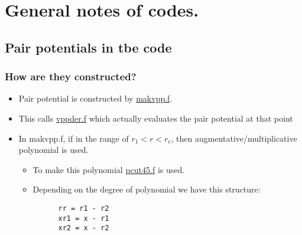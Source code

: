 \documentclass[11pt]{article}
\begin{document}
\section{General notes of codes.}
\label{sec-2}

\subsection{Pair potentials in tbe code}
\label{sec-2-1}
\subsubsection{How are they constructed?}
\label{sec-2-1-1}
\begin{itemize}
\item Pair potential is constructed by \href{file:///home/tigany/lm/tb/makvpp.f}{makvpp.f}.
\item This calls \href{file:///home/tigany/lm/tb/vppder.f}{vppder.f} which actually evaluates the pair potential at that
point
\item In makvpp.f, if in the range of $r_1 < r < r_{\text{c}}$, then
augmentative/multiplicative polynomial is used.
\begin{itemize}
\item To make this polynomial \href{file:///home/tigany/lm/tb/pcut45.f}{pcut45.f} is used.
\item Depending on the degree of polynomial we have this structure:
\begin{verbatim}
      rr = r1 - r2
      xr1 = x - r1
      xr2 = x - r2


\end{verbatim}
\end{itemize}
\end{itemize}
\end{document}
